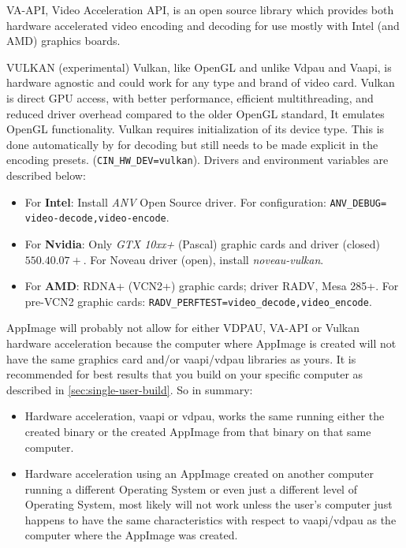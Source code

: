 VA-API, Video Acceleration API, is an open source library which provides both hardware accelerated video encoding and decoding for use mostly with Intel (and AMD) graphics boards.

VULKAN (experimental) Vulkan, like OpenGL and unlike Vdpau and Vaapi, is hardware agnostic and could work for any type and brand of video card. Vulkan is direct GPU access, with better performance, efficient multithreading, and reduced driver overhead compared to the older OpenGL standard, It emulates OpenGL functionality. 
Vulkan requires initialization of its device type. This is done automatically by \CGG{} for decoding but still needs to be made explicit in the encoding presets. (\texttt{CIN\_HW\_DEV=vulkan}). Drivers and environment variables are described below:
\begin{itemize}
	\item For \textbf{Intel}: Install \textit{ANV} Open Source driver. For configuration: \texttt{ANV\_DEBUG=\\video-decode,video-encode}.
	\item For \textbf{Nvidia}: Only \textit{GTX 10xx+} (Pascal) graphic cards and driver (closed) $550.40.07+$. For Noveau driver (open), install \textit{noveau-vulkan}.
	\item For \textbf{AMD}: RDNA+ (VCN2+) graphic cards; driver RADV, Mesa 285+. For pre-VCN2 graphic cards: \texttt{RADV\_PERFTEST=video\_decode,video\_encode}.
\end{itemize}

AppImage will probably not allow for either VDPAU, VA-API or Vulkan hardware acceleration because the
computer where AppImage is created will not have the same graphics card and/or vaapi/vdpau
libraries as yours.  
It is recommended for best results that you build \CGG{} on your specific computer as described in \ref{sec:single-user-build}.
So in summary:
\begin{itemize}
	\item Hardware acceleration, vaapi or vdpau, works the same running either the created binary or the created AppImage from that binary on that same computer.
	\item Hardware acceleration using an AppImage created on another computer running a different Operating System or even just a different level of Operating System, most likely will not work unless the user's computer just happens to have the same characteristics with respect to vaapi/vdpau as the computer where the AppImage was created.
\end{itemize}

